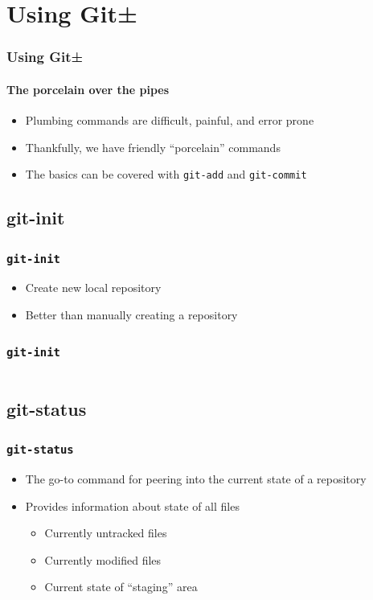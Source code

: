 \documentclass[]{beamer}
\begin{document}
\section{Using Git±}
\begin{frame}
\frametitle{Using Git±}
\framesubtitle{The porcelain over the pipes}
\begin{itemize}
\item{Plumbing commands are difficult, painful, and error prone}
\item{Thankfully, we have friendly ``porcelain'' commands}
\item{The basics can be covered with \texttt{git-add} and \texttt{git-commit}}
\end{itemize}
\end{frame}

\subsection{git-init}
\begin{frame}
\frametitle{\texttt{git-init}}
\begin{itemize}
\item{Create new local repository}
\item{Better than manually creating a repository}
\end{itemize}
\end{frame}

\begin{frame}[fragile]
\frametitle{\texttt{git-init}}
\inputminted[fontsize=\scriptsize{}]{bash}{code/4/git-init}
\end{frame}

\subsection{git-status}
\begin{frame}
\frametitle{\texttt{git-status}}
\begin{itemize}
\item{The go-to command for peering into the current state of a repository}
\item{Provides information about state of all files}
\begin{itemize}
\item{Currently untracked files}
\item{Currently modified files}
\item{Current state of ``staging'' area}
\end{itemize}
\end{itemize}
\end{frame}
\end{document}
